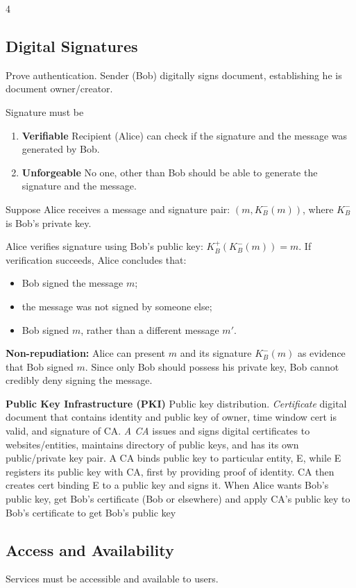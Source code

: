 \documentclass[10pt]{extarticle}
\begin{document}
\begin{multicols}{4}
\subsection{Digital Signatures}
Prove authentication. Sender (Bob) digitally signs document, establishing he is document owner/creator.

Signature must be
\begin{enumerate}
\item \textbf{Verifiable} Recipient (Alice) can check if the signature and the message was generated by Bob.
\item \textbf{Unforgeable} No one, other than Bob should be able to generate the signature and the message.
\end{enumerate}

Suppose Alice receives a message and signature pair: $\left(m, K_B^{-}(m)\right)$, where $K_B^{-}$ is Bob's private key.

Alice verifies signature using Bob's public key: $K_B^{+}\left(K_B^{-}(m)\right) = m$. If verification succeeds, Alice concludes that:
\begin{itemize}
\item Bob signed the message $m$;
\item the message was not signed by someone else;
\item Bob signed $m$, rather than a different message $m'$.
\end{itemize}
\textbf{Non-repudiation:} Alice can present $m$ and its signature $K_B^{-}(m)$ as evidence that Bob signed $m$. Since only Bob should possess his private key, Bob cannot credibly deny signing the message.

\textbf{Public Key Infrastructure (PKI)}
Public key distribution.
\textit{Certificate } digital document that contains identity and public key of owner, time window cert is valid, and signature of CA.
\textit{A CA} issues and signs digital certificates to websites/entities, maintains directory of public keys, and has its own public/private key pair. A CA binds public key to particular entity, E, while E registers its public key with CA, first by providing proof of identity. CA then creates cert binding E to a public key and signs it.
When Alice wants Bob’s public key, get Bob’s certificate (Bob or elsewhere) and apply CA’s public key to Bob’s certificate to get Bob’s public key

\subsection{Access and Availability}
Services must be accessible and available to users.


\end{multicols}
\end{document}
